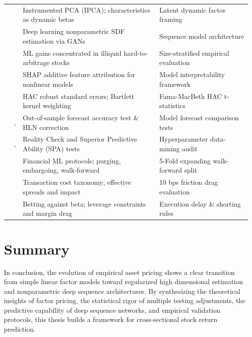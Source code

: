 \begin{table}[htbp]
{\begin{tabular}{llll}
& \citet{kelly2019characteristics} & Instrumented PCA (IPCA); characteristics as dynamic betas & Latent dynamic factor framing \\
& \citet{chen2023deep} & Deep learning nonparametric SDF estimation via GANs & Sequence model architecture \\
& \citet{avramov2023machine} & ML gains concentrated in illiquid hard-to-arbitrage stocks & Size-stratified empirical evaluation \\
& \citet{lundberg2017unified} & SHAP additive feature attribution for nonlinear models & Model interpretability framework \\
\midrule
{} 
& \citet{newey1987simple} & HAC robust standard errors; Bartlett kernel weighting & Fama-MacBeth HAC t-statistics \\
& \citet{diebold1995comparing}, \citet{harvey1997testing} & Out-of-sample forecast accuracy test \& HLN correction & Model forecast comparison tests \\
& \citet{white2000reality}, \citet{hansen2005superior} & Reality Check and Superior Predictive Ability (SPA) tests & Hyperparameter data-mining audit \\
\midrule
{} 
& \citet{lopez2018advances} & Financial ML protocols; purging, embargoing, walk-forward & 5-Fold expanding walk-forward split \\
& \citet{novy2016taxonomy} & Transaction cost taxonomy; effective spreads and impact & 10 bps friction drag evaluation \\
& \citet{frazzini2014betting} & Betting against beta; leverage constraints and margin drag & Execution delay \& shorting rules \\
\bottomrule
\end{tabular}%
}
\end{table}

\section{Summary}
In conclusion, the evolution of empirical asset pricing shows a clear transition from simple linear factor models toward regularized high dimensional estimation and nonparametric deep sequence architectures. By synthesizing the theoretical insights of factor pricing, the statistical rigor of multiple testing adjustments, the predictive capability of deep sequence networks, and empirical validation protocols, this thesis builds a framework for cross-sectional stock return prediction.
